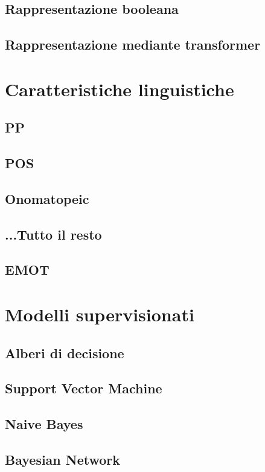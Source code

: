 \documentclass[oneside]{book}
\begin{document}
\subsection{Rappresentazione booleana}

\subsection{Rappresentazione mediante transformer}

\section{Caratteristiche linguistiche}
\subsection{PP}
\subsection{POS}
\subsection{Onomatopeic}
\subsection{...Tutto il resto}
\subsection{EMOT}

\section{Modelli supervisionati}
\subsection{Alberi di decisione}
\subsection{Support Vector Machine}
\subsection{Naive Bayes}
\subsection{Bayesian Network}
\end{document}
